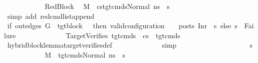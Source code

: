 \begin{isabellebody}
\ \ \ \ \ \ \ \ \ \ \isamarkupfalse%
\ RedBlock{}\ \isamarkupfalse%
\ {\isachardoublequoteopen}M{\isacharcomma}{\kern0pt}{\isasymLambda}{\isacharcomma}{\kern0pt}{\isasymGamma}{\isacharcomma}{\kern0pt}{\isasymOmega}\ {\isasymturnstile}\ {\isasymlangle}cs{\isacharat}{\kern0pt}tgt{\isacharunderscore}{\kern0pt}cmds{\isacharunderscore}{\kern0pt}{}{\isacharcomma}{\kern0pt}Normal\ ns{\isasymrangle}\ {\isacharbrackleft}{\kern0pt}{\isasymrightarrow}{\isacharbrackright}{\kern0pt}\ s{}{\isacharprime}{\kern0pt}{\isachardoublequoteclose}\isanewline
\ \ \ \ \ \ \ \ \ \ \ \ \isamarkupfalse%
\ {\isacharparenleft}{\kern0pt}simp\ add{\isacharcolon}{\kern0pt}\ red{\isacharunderscore}{\kern0pt}cmd{\isacharunderscore}{\kern0pt}list{\isacharunderscore}{\kern0pt}append{\isacharparenright}{\kern0pt}\isanewline
\ \ \ \ \ \ \ \ \ \ \isamarkupfalse%
\ {\isachardoublequoteopen}if\ out{\isacharunderscore}{\kern0pt}edges\ G{\isacharprime}{\kern0pt}\ {\isacharbang}{\kern0pt}\ tgt{\isacharunderscore}{\kern0pt}block\ {\isacharequal}{\kern0pt}\ {\isacharbrackleft}{\kern0pt}{\isacharbrackright}{\kern0pt}\ then\ valid{\isacharunderscore}{\kern0pt}configuration\ {\isasymLambda}\ {\isasymGamma}\ {\isasymOmega}\ posts\ {\isacharparenleft}{\kern0pt}Inr\ {\isacharparenleft}{\kern0pt}{\isacharparenright}{\kern0pt}{\isacharparenright}{\kern0pt}\ s{}{\isacharprime}{\kern0pt}\ else\ s{}{\isacharprime}{\kern0pt}\ {\isasymnoteq}\ Failure{\isachardoublequoteclose}\isanewline
\ \ \ \ \ \ \ \ \ \ \ \ \isamarkupfalse%
\ TargetVerifies\ {\isacartoucheopen}tgt{\isacharunderscore}{\kern0pt}cmds{\isacharunderscore}{\kern0pt}{}\ {\isacharequal}{\kern0pt}\ cs\ {\isacharat}{\kern0pt}\ tgt{\isacharunderscore}{\kern0pt}cmds{\isacharunderscore}{\kern0pt}{}{\isacartoucheclose}\isanewline
\ \ \ \ \ \ \ \ \ \ \ \ \isamarkupfalse%
\ hybrid{\isacharunderscore}{\kern0pt}block{\isacharunderscore}{\kern0pt}lemma{\isacharunderscore}{\kern0pt}target{\isacharunderscore}{\kern0pt}verifies{\isacharunderscore}{\kern0pt}def\isanewline
\ \ \ \ \ \ \ \ \ \ \ \ \isamarkupfalse%
\ simp\isanewline
\ \ \ \ \ \ \ \ \isamarkupfalse%
\isanewline
\ \ \ \ \ \ \ \ \ \ \isamarkupfalse%
\ s{}{\isacharprime}{\kern0pt}\isanewline
\ \ \ \ \ \ \ \ \ \ \isamarkupfalse%
\ {\isachardoublequoteopen}M{\isacharcomma}{\kern0pt}{\isasymLambda}{\isacharcomma}{\kern0pt}{\isasymGamma}{\isacharcomma}{\kern0pt}{\isasymOmega}\ {\isasymturnstile}\ {\isasymlangle}tgt{\isacharunderscore}{\kern0pt}cmds{\isacharunderscore}{\kern0pt}{}{\isacharcomma}{\kern0pt}Normal\ ns{}{\isasymrangle}\ {\isacharbrackleft}{\kern0pt}{\isasymrightarrow}{\isacharbrackright}{\kern0pt}\ s{}{\isacharprime}{\kern0pt}{\isachardoublequoteclose}\isanewline

\end{isabellebody}
